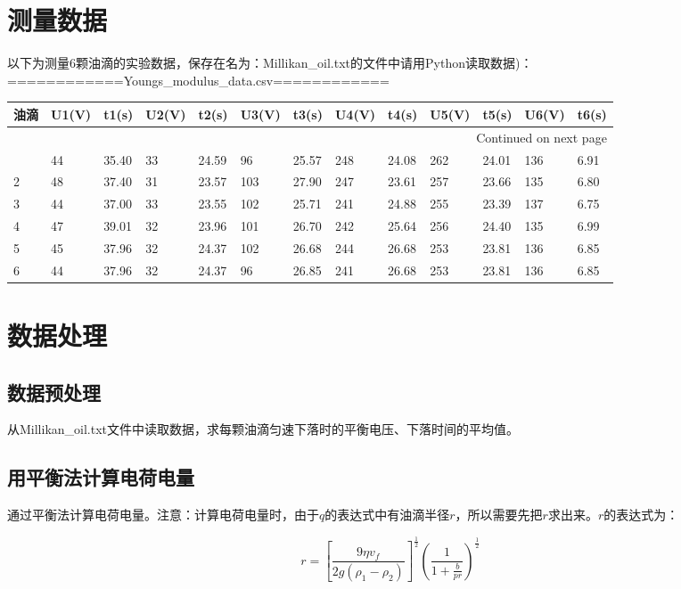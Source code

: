 \section{测量数据}
以下为测量6颗油滴的实验数据，保存在名为：Millikan\_oil.txt的文件中请用Python读取数据)：\\
============Youngs\_modulus\_data.csv============\\
\begin{longtable}{lllllllllllll}
\toprule
油滴 & U1(V) & t1(s) & U2(V) & t2(s) & U3(V) & t3(s) & U4(V) & t4(s) & U5(V) & t5(s) & U6(V) & t6(s) \\
\midrule
\endfirsthead

\toprule
\midrule
\endhead
\midrule
\multicolumn{13}{r}{{Continued on next page}} \\
\midrule
\endfoot

\bottomrule
\endlastfoot
1 & 44 & 35.40 & 33 & 24.59 &  96 & 25.57 & 248 & 24.08 & 262 & 24.01 & 136 & 6.91 \\
2 & 48 & 37.40 & 31 & 23.57 & 103 & 27.90 & 247 & 23.61 & 257 & 23.66 & 135 & 6.80 \\
3 & 44 & 37.00 & 33 & 23.55 & 102 & 25.71 & 241 & 24.88 & 255 & 23.39 & 137 & 6.75 \\
4 & 47 & 39.01 & 32 & 23.96 & 101 & 26.70 & 242 & 25.64 & 256 & 24.40 & 135 & 6.99 \\
5 & 45 & 37.96 & 32 & 24.37 & 102 & 26.68 & 244 & 26.68 & 253 & 23.81 & 136 & 6.85 \\
6 & 44 & 37.96 & 32 & 24.37 &  96 & 26.85 & 241 & 26.68 & 253 & 23.81 & 136 & 6.85
\end{longtable}

\section{数据处理}

\subsection{数据预处理}
从Millikan\_oil.txt文件中读取数据，求每颗油滴匀速下落时的平衡电压、下落时间的平均值。

\subsection{用平衡法计算电荷电量}
通过平衡法计算电荷电量。注意：计算电荷电量时，由于$q$的表达式中有油滴半径$r$，所以需要先把$r$求出来。$r$的表达式为：

\begin{equation}
r=\left[ \frac{9\eta v_f}{2g\left( \rho _1-\rho _2 \right)} \right] ^{\frac{1}{2}}\left( \frac{1}{1+\frac{b}{pr}} \right) ^{\frac{1}{2}}
\end{equation}

